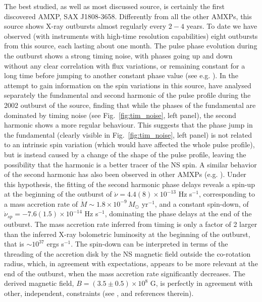 \documentclass[graybox]{svmult}
\begin{document}
The best studied, as well as most discussed source, is certainly the first discovered AMXP, SAX J1808-3658. Differently from all the other AMXPs, this source shows X-ray outbursts almost regularly every $2-4$ years. To date we have observed (with instruments with high-time resolution capabilities) eight outbursts from this source, each lasting about one month. The pulse phase evolution during the outburst shows a strong timing noise, with phases going up and down without any clear correlation with flux variations, or remaining constant for a long time before jumping to another constant phase value (see e.g. \cite{Hartman2008,Hartman2009a, Hartman2009b}). In the attempt to gain information on the spin variations in this source, \cite{Burderi2006} have analysed separately the fundamental and second harmonic of the pulse profile during the 2002 outburst of the source, finding that while the phases of the fundamental are dominated by timing noise (see Fig.~\ref{fig:tim_noise}, left panel), the second harmonic shows a more regular behaviour. This suggests that the phase jump in the fundamental (clearly visible in Fig.~\ref{fig:tim_noise}, left panel) is not related to an intrinsic spin variation (which would have affected the whole pulse profile), but is instead caused by a change of the shape of the pulse profile, leaving the possibility that the harmonic is a better tracer of the NS spin. A similar behavior of the second harmonic has also been observed in other AMXPs (e.g. \cite{Riggio2008,Riggio2011,Papitto2012}).  Under this hypothesis, the fitting of the second harmonic phase delays reveals a spin-up at the beginning of the outburst of $\dot \nu = 4.4(8) \times 10^{-13}$ Hz s$^{-1}$, corresponding to a mass accretion rate of $\dot M \sim 1.8 \times 10^{-9}\, M_\odot$ yr$^{-1}$, and a constant spin-down, of $\dot \nu_{sp} = -7.6(1.5) \times 10^{-14}$ Hz s$^{-1}$, dominating the phase delays at the end of the outburst. The mass accretion rate inferred from timing is only a factor of 2 larger than the inferred X-ray bolometric luminosity at the beginning of the outburst, that is $\sim 10^{37}$ ergs s$^{-1}$. The spin-down can be interpreted in terms of the threading of the accretion disk by the NS magnetic field outside the co-rotation radius, which, in agreement with expectations, appears to be more relevant at the end of the outburst, when the mass accretion rate significantly decreases. The derived magnetic field, $B = (3.5 \pm 0.5) \times 10^8$ G, is perfectly in agreement with other, independent, constraints (see \cite{Burderi2006}, and references therein).
\end{document}
